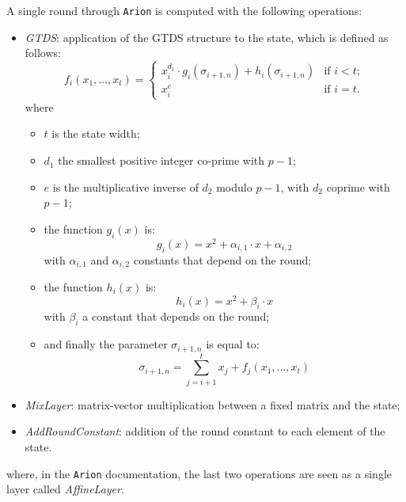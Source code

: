 \documentclass[12pt, a4paper]{report}
\begin{document}
A single round through \texttt{Arion} is computed with the following operations:
\begin{itemize}
  \item \textit{GTDS}: application of the GTDS structure to the state, which is defined as follows:
    \begin{equation}
      f_i(x_1, \ldots, x_t) = \left\{
          \begin{array}{ll}
            x_i^{d_1} \cdot g_i(\sigma_{i+1, n}) + h_i(\sigma_{i+1, n}) & \text{if } i < t; \\
            x_i^{e} & \text{if } i = t.
          \end{array}
        \right.
      \label{eq:gtds}
    \end{equation}
    where
    \begin{itemize}
      \item $t$ is the state width;
      \item $d_1$ the smallest positive integer co-prime with $p-1$;
      \item $e$ is the multiplicative inverse of $d_2$ modulo $p-1$, with $d_2$ coprime with $p-1$;
      \item the function $g_i(x)$ is:
        \begin{equation}
          g_i(x) = x^2 + \alpha_{i,1} \cdot x + \alpha_{i,2}
          \label{eq:g}
        \end{equation}
        with $\alpha_{i,1}$ and $\alpha_{i,2}$ constants that depend on the round;
      \item the function $h_i(x)$ is:
        \begin{equation}
          h_i(x) = x^2 + \beta_i \cdot x
          \label{eq:h}
        \end{equation}
        with $\beta_i$ a constant that depends on the round;
      \item and finally the parameter $\sigma_{i+1, n}$ is equal to:
        \begin{equation}
          \sigma_{i+1, n} = \sum_{j=i+1}^{t} x_j + f_j(x_1, \ldots, x_t)
          \label{eq:theta}
        \end{equation}
    \end{itemize}
  \item \textit{MixLayer}: matrix-vector multiplication between a fixed matrix and the state;
  \item \textit{AddRoundConstant}: addition of the round constant to each element of the state.
\end{itemize}
where, in the \texttt{Arion} documentation\cite{arion}, the last two operations are seen as a single layer called \textit{AffineLayer}.
\end{document}
